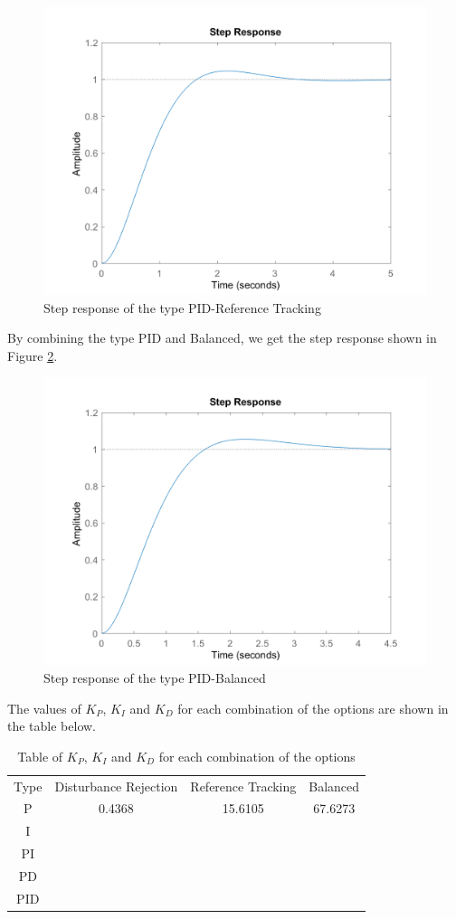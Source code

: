 \documentclass[a4paper, twocolumn, titlepage, 10pt]{article}
\begin{document}
\begin{figure}[H]
	\centering
	\includegraphics[width=\linewidth]{PID-track-step}
	\caption{Step response of the type PID-Reference Tracking}
	\label{PID-track-step}
\end{figure}
						   	By combining the type PID and Balanced, we get the step response shown in Figure \ref{PID-balance-step}.
\begin{figure}[H]
	\centering
	\includegraphics[width=\linewidth]{PID-balance-step}
	\caption{Step response of the type PID-Balanced}
	\label{PID-balance-step}
\end{figure}	
The values of $K_P$, $K_I$ and $K_D$ for each combination of the options are shown in the table below.
\begin{table}[H]
	\centering
	\begin{tabular}{c c c c}
		Type & Disturbance Rejection & Reference Tracking & Balanced \\
	 P	& 0.4368 & 15.6105 & 67.6273 \\ 
	 I  &        &		   &		\\
	 PI &		&		&		\\
	 PD&		&		&		\\
	 PID&		&		&		
	\end{tabular}
	\caption{Table of $K_P$, $K_I$ and $K_D$ for each combination of the options}
	\label{combinations}
\end{table}	
\end{document}
